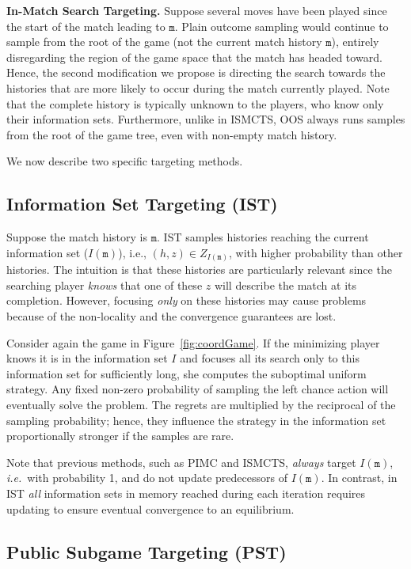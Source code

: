 \documentclass{aamas2015}
\newcommand{\ttm}{\mathtt{m}}
\newcommand{\ie}{{\it i.e.}~}
\begin{document}
{\bf In-Match Search Targeting.}
Suppose several moves have been played since the start of the match leading to $\ttm$. 
Plain outcome sampling would continue to sample from the root of the game (not the current match history $\ttm$), entirely 
disregarding the region of the game space that the match has headed toward. 
Hence, the second modification we propose is directing the search towards the histories that are more likely to occur during the match currently played.
Note that the complete history is typically unknown to the players, who know only their information sets.
Furthermore, unlike in ISMCTS, OOS always runs samples from the root of the game tree, even with non-empty match history.

We now describe two specific targeting methods.

\subsection{Information Set Targeting (IST)}

Suppose the match history is $\ttm$. IST samples histories reaching the current information set ($I(\ttm)$), 
i.e., $(h,z) \in Z_{I(\ttm)}$, with higher probability than other histories.
The intuition is that these histories are particularly 
relevant since the searching player {\it knows} that one of these $z$ will describe the match at its completion. 
However, focusing {\it only} on these histories may cause problems because of the non-locality and the convergence guarantees are lost.

Consider again the game in Figure~\ref{fig:coordGame}. 
If the minimizing player knows it is in the information set $I$ and focuses all its search only to this information set for sufficiently long, she computes the suboptimal uniform strategy.
Any fixed non-zero probability of sampling the left chance action will 
eventually solve the problem. The regrets are multiplied by the reciprocal of the sampling probability; hence, they influence the strategy 
in the information set proportionally stronger if the samples are rare.

Note that previous methods, such as PIMC and ISMCTS, {\it always} target $I(\ttm)$, \ie with probability 1, and do not 
update predecessors of $I(\ttm)$. In contrast, in IST {\it all} information sets in memory reached during each iteration requires updating 
to ensure eventual convergence to an equilibrium.

\subsection{Public Subgame Targeting (PST)}
\end{document}

